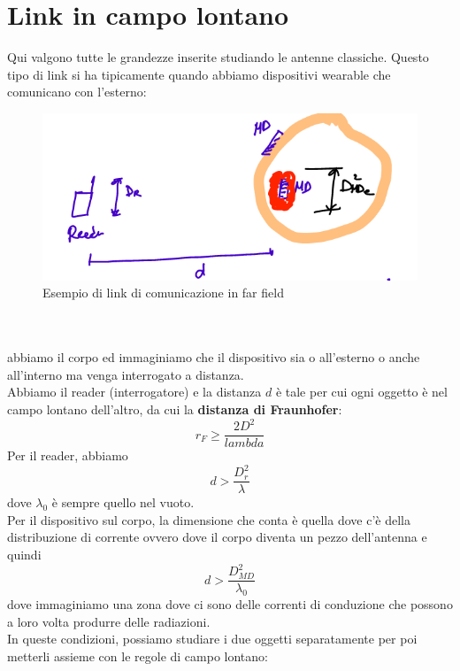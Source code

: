 \documentclass[oneside, 12pt]{extbook}
\begin{document}
\section{Link in campo lontano}
Qui valgono tutte le grandezze inserite studiando le antenne classiche. Questo tipo di link si ha tipicamente quando abbiamo dispositivi wearable che comunicano con l'esterno:\\
\begin{figure}[!h]
	\includegraphics[scale=0.5]{immagini/com_far_field.png}
	\caption{Esempio di link di comunicazione in far field}
\end{figure}\\\\
abbiamo il corpo ed immaginiamo che il dispositivo sia o all'esterno o anche all'interno ma venga interrogato a distanza.\\Abbiamo il reader (interrogatore) e la distanza $d$ è tale per cui ogni oggetto è nel campo lontano dell'altro, da cui la \textbf{distanza di Fraunhofer}:
\begin{equation}
	r_F \geq \frac{2D^2}{lambda}	
\end{equation}
Per il reader, abbiamo
\begin{equation}
	d > \frac{D_r^2}{\lambda}	
\end{equation}
dove $\lambda_0$ è sempre quello nel vuoto.\\Per il dispositivo sul corpo, la dimensione che conta è quella dove c'è della distribuzione di corrente ovvero dove il corpo diventa un pezzo dell'antenna e quindi 
\begin{equation}
	d > \frac{D_{MD}^2}{\lambda_0}
\end{equation}
dove immaginiamo una zona dove ci sono delle correnti di conduzione che possono a loro volta produrre delle radiazioni.\\In queste condizioni, possiamo studiare i due oggetti separatamente per poi metterli assieme con le regole di campo lontano:\\
\end{document}
